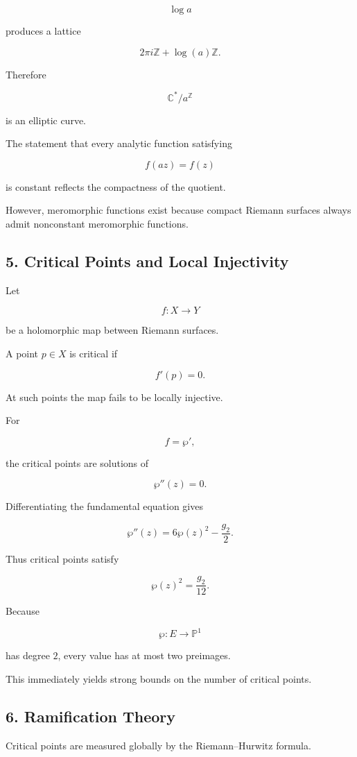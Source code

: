 \documentclass[12pt,a4paper]{article}
\theoremstyle{notespace}
\begin{document}
\[
\log a
\]

produces a lattice

\[
2\pi i\mathbb Z+\log(a)\mathbb Z.
\]

Therefore

\[
\mathbb C^*/a^{\mathbb Z}
\]

is an elliptic curve.

The statement that every analytic function satisfying

\[
f(az)=f(z)
\]

is constant reflects the compactness of the quotient.

However, meromorphic functions exist because compact Riemann surfaces always admit nonconstant meromorphic functions.

\subsection{5. Critical Points and Local Injectivity}

Let

\[
f:X\to Y
\]

be a holomorphic map between Riemann surfaces.

A point \(p\in X\) is critical if

\[
f'(p)=0.
\]

At such points the map fails to be locally injective.

For

\[
f=\wp',
\]

the critical points are solutions of

\[
\wp''(z)=0.
\]

Differentiating the fundamental equation gives

\[
\wp''(z)
=
6\wp(z)^2-\frac{g_2}{2}.
\]

Thus critical points satisfy

\[
\wp(z)^2
=
\frac{g_2}{12}.
\]

Because

\[
\wp:E\to\mathbb P^1
\]

has degree \(2\), every value has at most two preimages.

This immediately yields strong bounds on the number of critical points.

\subsection{6. Ramification Theory}

Critical points are measured globally by the Riemann--Hurwitz formula.
\end{document}
